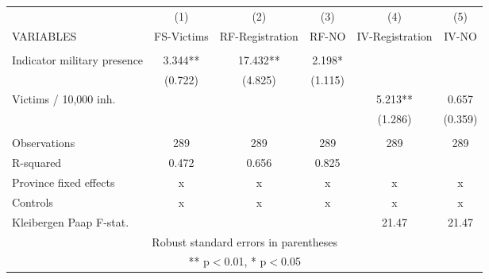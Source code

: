 \begin{tabular}{lccccc} \hline
 & (1) & (2) & (3) & (4) & (5) \\
VARIABLES & FS-Victims & RF-Registration & RF-NO & IV-Registration & IV-NO \\ \hline
 &  &  &  &  &  \\
Indicator military presence & 3.344** & 17.432** & 2.198* &  &  \\
 & (0.722) & (4.825) & (1.115) &  &  \\
Victims / 10,000 inh. &  &  &  & 5.213** & 0.657 \\
 &  &  &  & (1.286) & (0.359) \\
 &  &  &  &  &  \\
Observations & 289 & 289 & 289 & 289 & 289 \\
R-squared & 0.472 & 0.656 & 0.825 &  &  \\
Province fixed effects & x & x & x & x & x \\
Controls & x & x & x & x & x \\
 Kleibergen Paap F-stat. &  &  &  & 21.47 & 21.47 \\ \hline
\multicolumn{6}{c}{ Robust standard errors in parentheses} \\
\multicolumn{6}{c}{ ** p$<$0.01, * p$<$0.05} \\
\end{tabular}
